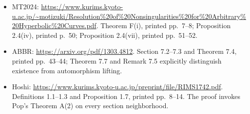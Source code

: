 \begin{itemize}
\item MT2024: \url{https://www.kurims.kyoto-u.ac.jp/~motizuki/Resolution%20of%20Nonsingularities%20for%20Arbitrary%20Hyperbolic%20Curves.pdf}.
Theorem F(i), printed pp.~7--8; Proposition 2.4(iv), printed p.~50;
Proposition 2.4(vii), printed pp.~51--52.
\item ABBR: \url{https://arxiv.org/pdf/1303.4812}.
Section 7.2--7.3 and Theorem 7.4, printed pp.~43--44;
Theorem 7.7 and Remark 7.5 explicitly distinguish existence from
automorphism lifting.
\item Hoshi: \url{https://www.kurims.kyoto-u.ac.jp/preprint/file/RIMS1742.pdf}.
Definitions 1.1--1.3 and Proposition 1.7, printed pp.~8--14.
The proof invokes Pop's Theorem A(2) on every section neighborhood.
\end{itemize}
